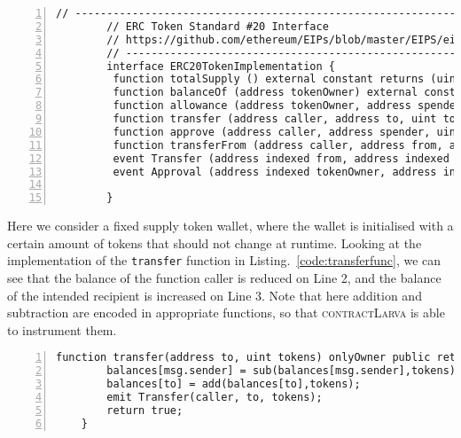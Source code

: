 \documentclass{article}
\newcommand{\contractlarva}{\textsc{contractLarva}\xspace}
\begin{document}
       \small\begin{lstlisting}[language=DEA,basicstyle=\scriptsize,numbers=left,numbersep=2pt,xleftmargin=0.3cm,escapechar=\%,label={code:erc20interface}]
        // ----------------------------------------------------------------------------
        // ERC Token Standard #20 Interface
        // https://github.com/ethereum/EIPs/blob/master/EIPS/eip-20-token-standard.md
        // ----------------------------------------------------------------------------
        interface ERC20TokenImplementation {
         function totalSupply () external constant returns (uint);
         function balanceOf (address tokenOwner) external constant returns (uint balance);
         function allowance (address tokenOwner, address spender) external constant returns (uint remaining);
         function transfer (address caller, address to, uint tokens) external returns (bool success);
         function approve (address caller, address spender, uint tokens) external returns (bool success);
         function transferFrom (address caller, address from, address to, uint tokens) external returns (bool success);
         event Transfer (address indexed from, address indexed to, uint tokens);
         event Approval (address indexed tokenOwner, address indexed spender, uint tokens);
        
        }
            \end{lstlisting}\normalsize
   
   Here we consider a fixed supply token wallet, where the wallet is initialised with a certain amount of tokens that should not change at runtime. Looking at the implementation of the \texttt{transfer} function in Listing.~\ref{code:transferfunc}, we can see that the balance of the function caller is reduced on Line 2, and the balance of the intended recipient is increased on Line 3. Note that here addition and subtraction are encoded in appropriate functions, so that \contractlarva is able to instrument them.
         
         
             \small\begin{lstlisting}[language=DEA,basicstyle=\scriptsize,numbers=left,numbersep=2pt,xleftmargin=0.3cm,escapechar=\%,label={code:transferfunc}]
    function transfer(address to, uint tokens) onlyOwner public returns (bool success) {
        balances[msg.sender] = sub(balances[msg.sender],tokens);
        balances[to] = add(balances[to],tokens);
        emit Transfer(caller, to, tokens);
        return true;
    }
                  \end{lstlisting}\normalsize
\end{document}
